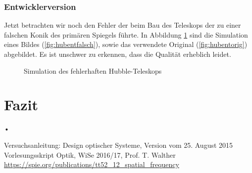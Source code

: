 \documentclass[twoside,colorback,accentcolor=tud4c,11pt]{tudreport}
\begin{document}
\subsection{Entwicklerversion}
Jetzt betrachten wir noch den Fehler der beim Bau des Teleskops der zu einer falschen Konik des primären Spiegels führte. In Abbildung \ref{fig:hubent} sind die Simulation eines Bildes (\ref{fig:hubentfalsch}), sowie das verwendete Original (\ref{fig:hubentorig}) abgebildet. Es ist unschwer zu erkennen, dass die Qualität erheblich leidet.
\begin{figure}[H]
\centering
  \quad
  \quad   
  \caption{Simulation des fehlerhaften Hubble-Teleskops}
  \label{fig:hubent}
\end{figure}
\chapter{Fazit}	
•
\renewcommand{\bibname}{Literatur}
\begin{thebibliography}{0}
 Versuchsanleitung: Design optischer Systeme, Version vom 25. August 2015
 Vorlesungsskript Optik, WiSe 2016/17, Prof. T. Walther
 \url{https://spie.org/publications/tt52_12_spatial_frequency}

\end{thebibliography}
\end{document}

